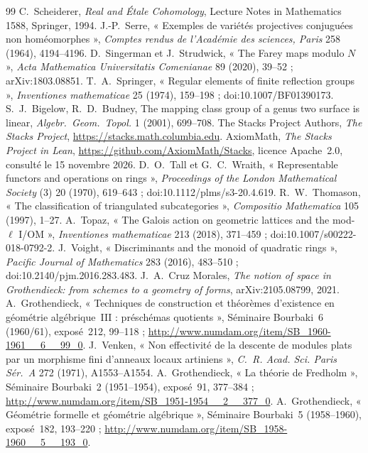 \documentclass[11pt]{article}
\theoremstyle{plain}
\theoremstyle{definition}
\theoremstyle{plain}
\theoremstyle{definition}
\theoremstyle{remark}
\renewcommand{\_}{\bkunderscore\allowbreak}
\begin{document}
\begin{thebibliography}{99}
 C.~Scheiderer, \emph{Real and Étale Cohomology}, Lecture Notes in Mathematics 1588, Springer, 1994.
 J.-P.~Serre, « Exemples de variétés projectives conjuguées non homéomorphes », \emph{Comptes rendus de l'Académie des sciences, Paris} 258 (1964), 4194--4196.
 D.~Singerman et J.~Strudwick, « The Farey maps modulo $N$ », \emph{Acta Mathematica Universitatis Comenianae} 89 (2020), 39--52 ; arXiv:1803.08851.
 T.~A.~Springer, « Regular elements of finite reflection groups », \emph{Inventiones mathematicae} 25 (1974), 159--198 ; doi:10.1007/BF01390173.
 S.~J.~Bigelow, R.~D.~Budney, The mapping class group of a genus two surface is linear, \emph{Algebr.\ Geom.\ Topol.} 1 (2001), 699--708.
 The Stacks Project Authors, \emph{The Stacks Project}, \url{https://stacks.math.columbia.edu}.
 AxiomMath, \emph{The Stacks Project in Lean}, \url{https://github.com/AxiomMath/Stacks}, licence Apache~2.0, consulté le 15 novembre 2026.
 D.~O.~Tall et G.~C.~Wraith, « Representable functors and operations on rings », \emph{Proceedings of the London Mathematical Society} (3) 20 (1970), 619--643 ; doi:10.1112/plms/s3-20.4.619.
 R.~W.~Thomason, « The classification of triangulated subcategories », \emph{Compositio Mathematica} 105 (1997), 1--27.
 A.~Topaz, « The Galois action on geometric lattices and the mod-$\ell$ I/OM », \emph{Inventiones mathematicae} 213 (2018), 371--459 ; doi:10.1007/s00222-018-0792-2.
 J.~Voight, « Discriminants and the monoid of quadratic rings », \emph{Pacific Journal of Mathematics} 283 (2016), 483--510 ; doi:10.2140/pjm.2016.283.483.
 J.~A.~Cruz Morales, \emph{The notion of space in Grothendieck: from schemes to a geometry of forms}, arXiv:2105.08799, 2021.
 A.~Grothendieck, « Techniques de construction et théorèmes d'existence en géométrie algébrique~III : préschémas quotients », Séminaire Bourbaki~6 (1960/61), exposé~212, 99--118 ; \url{http://www.numdam.org/item/SB_1960-1961__6__99_0}.
 J.~Venken, « Non effectivité de la descente de modules plats par un morphisme fini d'anneaux locaux artiniens », \emph{C.~R. Acad. Sci. Paris Sér.~A} 272 (1971), A1553--A1554.
 A.~Grothendieck, « La théorie de Fredholm », Séminaire Bourbaki~2 (1951--1954), exposé~91, 377--384 ; \url{http://www.numdam.org/item/SB_1951-1954__2__377_0}.
 A.~Grothendieck, « Géométrie formelle et géométrie algébrique », Séminaire Bourbaki~5 (1958--1960), exposé~182, 193--220 ; \url{http://www.numdam.org/item/SB_1958-1960__5__193_0}.
\end{thebibliography}
\end{document}
